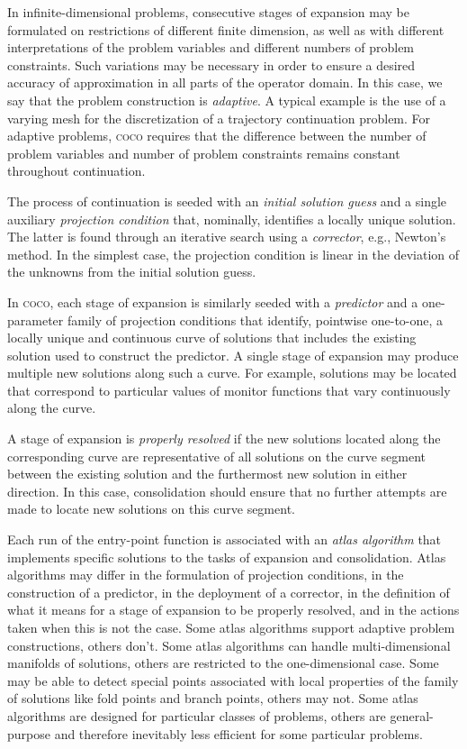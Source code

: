 In infinite-dimensional problems, consecutive stages of expansion may be formulated on restrictions of different finite dimension, as well as with different interpretations of the problem variables and different numbers of problem constraints. Such variations may be necessary in order to ensure a desired accuracy of approximation in all parts of the operator domain. In this case, we say that the problem construction is \emph{adaptive}. A typical example is the use of a varying mesh for the discretization of a trajectory continuation problem. For adaptive problems, \textsc{coco} requires that the difference between the number of problem variables and number of problem constraints remains constant throughout continuation.

The process of continuation is seeded with an \emph{initial solution guess} and a single auxiliary \emph{projection condition} that, nominally, identifies a locally unique solution. The latter is found through an iterative search using a \emph{corrector}, e.g., Newton's method. In the simplest case, the projection condition is linear in the deviation of the unknowns from the initial solution guess.

In \textsc{coco}, each stage of expansion is similarly seeded with a \emph{predictor} and a one-parameter family of projection conditions that identify, pointwise one-to-one, a locally unique and continuous curve of solutions that includes the existing solution used to construct the predictor. A single stage of expansion may produce multiple new solutions along such a curve. For example, solutions may be located that correspond to particular values of monitor functions that vary continuously along the curve.

A stage of expansion is \emph{properly resolved} if the new solutions located along the corresponding curve are representative of all solutions on the curve segment between the existing solution and the furthermost new solution in either direction. In this case, consolidation should ensure that no further attempts are made to locate new solutions on this curve segment.

Each run of the  entry-point function is associated with an \emph{atlas algorithm} that implements specific solutions to the tasks of expansion and consolidation. Atlas algorithms may differ in the formulation of projection conditions, in the construction of a predictor, in the deployment of a corrector, in the definition of what it means for a stage of expansion to be properly resolved, and in the actions taken when this is not the case. Some atlas algorithms support adaptive problem constructions, others don't. Some atlas algorithms can handle multi-dimensional manifolds of solutions, others are restricted to the one-dimensional case. Some may be able to detect special points associated with local properties of the family of solutions like fold points and branch points, others may not. Some atlas algorithms are designed for particular classes of problems, others are general-purpose and therefore inevitably less efficient for some particular problems.


